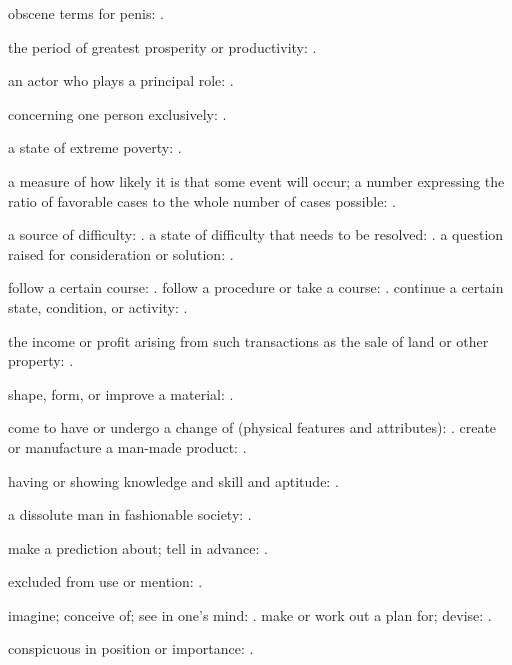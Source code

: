   obscene terms for penis: .

  the period of greatest prosperity or productivity: .

  an actor who plays a principal role: .

  concerning one person exclusively: .

  a state of extreme poverty: .

  a measure of how likely it is that some event will occur; a number expressing the ratio of favorable cases to the whole number of cases possible: .

  a source of difficulty: . a state of difficulty that needs to be resolved: . a question raised for consideration or solution: .

  follow a certain course: . follow a procedure or take a course: . continue a certain state, condition, or activity: .

  the income or profit arising from such transactions as the sale of land or other property: .

  shape, form, or improve a material: .

  come to have or undergo a change of (physical features and attributes): . create or manufacture a man-made product: .

  having or showing knowledge and skill and aptitude: .

  a dissolute man in fashionable society: .

  make a prediction about; tell in advance: .

  excluded from use or mention: .

  imagine; conceive of; see in one's mind: . make or work out a plan for; devise: .

  conspicuous in position or importance: .

